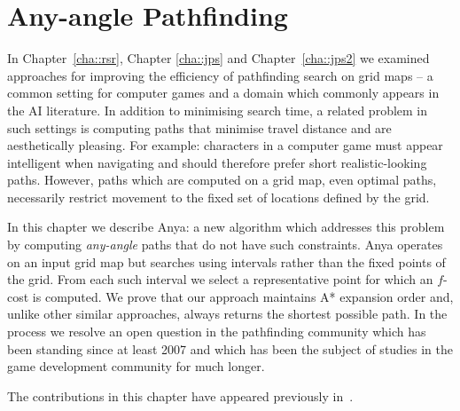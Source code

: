 \chapter{Any-angle Pathfinding}
\label{cha::anya}
In Chapter~\ref{cha::rsr}, Chapter \ref{cha::jps} and Chapter~\ref{cha::jps2}
we examined approaches for
improving the efficiency of pathfinding search on grid maps -- a common
setting for computer games and a domain which commonly appears in the AI
literature. 
In addition to minimising search time, a related problem in such settings
is computing paths that minimise travel distance and are aesthetically
pleasing. For example: characters in a computer game must appear intelligent
when navigating and should therefore prefer short realistic-looking paths.
However, paths which are computed on a grid map, even optimal paths,
necessarily restrict movement to the fixed set of locations defined by the
grid.
\par
In this chapter we describe Anya: a new algorithm which addresses this
problem by computing \emph{any-angle} paths that do not have such constraints.
Anya operates on an input grid map but searches using intervals rather than 
the fixed points of the grid. 
From each such interval we select a representative point for which an
$f$-cost is computed. 
We prove that our approach maintains A{*} expansion order and, unlike other
similar approaches, always returns the shortest possible path.
In the process we resolve an open question in the pathfinding community which
has been standing since at least 2007 and which has been the subject of
studies in the game development community for much longer.

The contributions in this chapter have appeared previously in~\citep{haraborG13}.

\newpage
